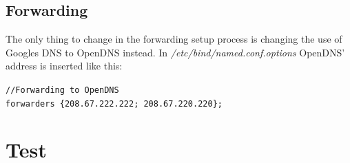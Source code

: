 \subsection{Forwarding}
The only thing to change in the forwarding setup process is changing the use of Googles DNS to OpenDNS instead. In \emph{/etc/bind/named.conf.options} OpenDNS' address is inserted like this:

\texttt{//Forwarding to OpenDNS} \\
\texttt{forwarders \{208.67.222.222; 208.67.220.220\};}

\section{Test}
		
